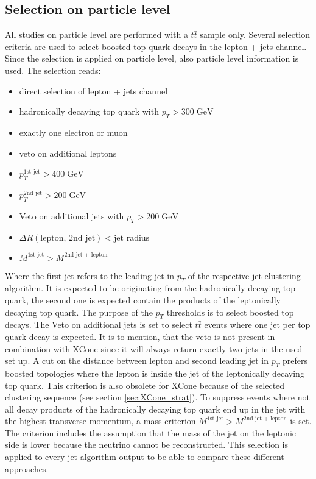 \subsection{Selection on particle level}
\label{sec:GenSel}
	All studies on particle level are performed with a $t\bar{t}$ sample only. Several selection criteria are used to select boosted top quark decays in the lepton + jets channel. Since the selection is applied on particle level, also particle level information is used. The selection reads:
	\begin{itemize}
	\item direct selection of lepton + jets channel
	\item hadronically decaying top quark with $p_T > 300\;\text{GeV}$
	\item exactly one electron or muon
	\item veto on additional leptons
	\item $p_T^{\text{1st jet}} > 400\;\text{GeV}$ 
	\item $p_T^{\text{2nd jet}} > 200\;\text{GeV}$ 
	\item Veto on additional jets with $p_T > 200\;\text{GeV}$ 
	\item $\Delta R (\text{lepton, 2nd jet}) < \text{jet radius}$
	\item $M^{\text{1st jet}} > M^{\text{2nd jet + lepton}}$
	\end{itemize}
	Where the first jet refers to the leading jet in $p_T$ of the respective jet clustering algorithm. It is expected to be originating from the hadronically decaying top quark, the second one is expected contain the products of the leptonically decaying top quark. The purpose of the $p_T$ thresholds is to select boosted top decays. The Veto on additional jets is set to select $t\bar{t}$ events where one jet per top quark decay is expected. It is to mention, that the veto is not present in combination with XCone since it will always return exactly two jets in the used set up. A cut on the distance between lepton and second leading jet in $p_T$ prefers boosted topologies where the lepton is inside the jet of the leptonically decaying top quark. This criterion is also obsolete for XCone because of the selected clustering sequence (see section \ref{sec:XCone_strat}). To suppress events where not all decay products of the hadronically decaying top quark end up in the jet with the highest transverse momentum, a mass criterion $M^{\text{1st jet}} > M^{\text{2nd jet + lepton}}$ is set. The criterion includes the assumption that the mass of the jet on the leptonic side is lower because the neutrino cannot be reconstructed. This selection is applied to every jet algorithm output to be able to compare these different approaches.
	
